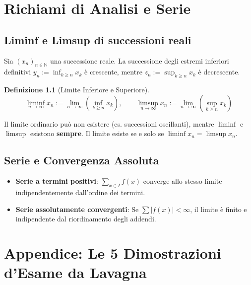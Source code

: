 \documentclass[11pt, a4paper]{report}
\theoremstyle{plain}
\theoremstyle{definition}
\newtheorem{definition}[theorem]{Definizione}
\theoremstyle{remark}
\newcommand{\N}{\mathbb{N}}
\newcommand{\1}{\mathbf{1}}
\begin{document}
\chapter{Richiami di Analisi e Serie}

\section{Liminf e Limsup di successioni reali}

Sia $(x_n)_{n \in \N}$ una successione reale. La successione degli estremi inferiori definitivi $y_n := \inf_{k \ge n} x_k$ è crescente, mentre $z_n := \sup_{k \ge n} x_k$ è decrescente.
\begin{definition}[Limite Inferiore e Superiore]
\[ \liminf_{n \to \infty} x_n := \lim_{n \to \infty} \left( \inf_{k \ge n} x_k \right), \qquad \limsup_{n \to \infty} x_n := \lim_{n \to \infty} \left( \sup_{k \ge n} x_k \right) \]
\end{definition}

\begin{spiegazione}
    Il limite ordinario può non esistere (es. successioni oscillanti), mentre $\liminf$ e $\limsup$ esistono \textbf{sempre}. Il limite esiste se e solo se $\liminf x_n = \limsup x_n$.
\end{spiegazione}

\section{Serie e Convergenza Assoluta}

\begin{itemize}
    \item \textbf{Serie a termini positivi}: $\sum_{x \in I} f(x)$ converge allo stesso limite indipendentemente dall'ordine dei termini.
    \item \textbf{Serie assolutamente convergenti}: Se $\sum |f(x)| < \infty$, il limite è finito e indipendente dal riordinamento degli addendi.
\end{itemize}

\newpage

\chapter*{Appendice: Le 5 Dimostrazioni d'Esame da Lavagna}
\end{document}
